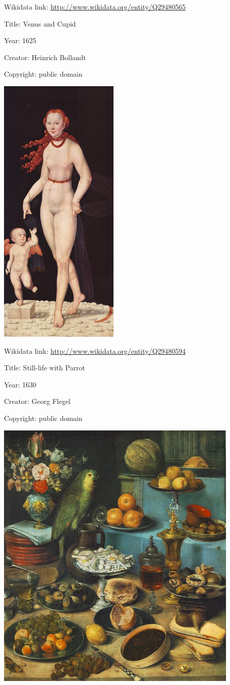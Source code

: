 \documentclass[
  letterpaper,
]{book}
\begin{document}
Wikidata link: \url{http://www.wikidata.org/entity/Q29480565}

Title: Venus and Cupid

Year: 1625

Creator: Heinrich Bollandt

Copyright: public domain

\includegraphics{./paintings_files/figure-pdf/cell-2-output-16.png}

Wikidata link: \url{http://www.wikidata.org/entity/Q29480594}

Title: Still-life with Parrot

Year: 1630

Creator: Georg Flegel

Copyright: public domain

\includegraphics{./paintings_files/figure-pdf/cell-2-output-18.png}
\end{document}
